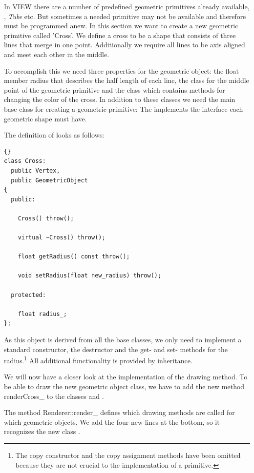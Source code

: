 In VIEW there are a number of
predefined geometric primitives already available, , {\em
Tube} etc. But sometimes a needed primitive may not be available and
therefore must be programmed anew. 
In this section we want to create a new geometric primitive called 'Cross'.
We define a cross to be a shape that consists of three lines that merge in one
point. Additionally we require all lines to be axis aligned and meet each
other in the middle.

To accomplish this we need three properties for the geometric object: the
float member radius that describes the half length of each line, the class 
 for the middle point of the geometric primitive and the class 
 which contains methods for changing the color of the
cross. In addition to these classes we need the main base class for
creating a geometric primitive: The  
implements the interface each geometric shape must have.

The definition of  looks as follows:
\begin{lstlisting}{}
class Cross: 
  public Vertex,
  public GeometricObject
{
  public:

    Cross() throw();

    virtual ~Cross() throw();
		
    float getRadius() const throw();

    void setRadius(float new_radius) throw();

  protected:
					
    float radius_;
};
\end{lstlisting}

As this object is derived from all the base classes, we only need to implement
a standard constructor, the destructor and the get- and set- methods for 
the radius.\footnote{The copy constructor and the copy assignment methods
have been omitted because they are not crucial to the implementation of a
primitive.} All additional functionality is provided by inheritance.

We will now have a closer look at the implementation of the drawing method. 
To be able to draw the new geometric object class, we have to add the new
method renderCross\_ to the classes  and .

The method Renderer::render\_ defines which drawing methods are called for
which geometric objects. We add the four new lines at the bottom, 
so it recognizes the new class .

